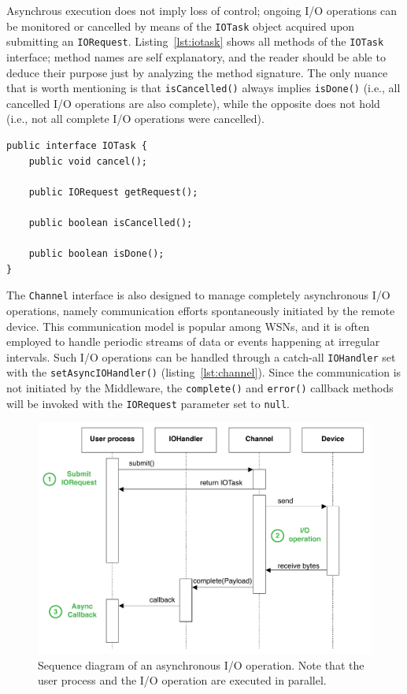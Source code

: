 Asynchrous execution does not imply loss of control; ongoing I/O operations can be monitored or cancelled by means of the \texttt{IOTask} object acquired upon submitting an \texttt{IORequest}. Listing~\ref{lst:iotask} shows all methods of the \texttt{IOTask} interface; method names are self explanatory, and the reader should be able to deduce their purpose just by analyzing the method signature. The only nuance that is worth mentioning is that \texttt{isCancelled()} always implies \texttt{isDone()} (i.e., all cancelled I/O operations are also complete), while the opposite does not hold (i.e., not all complete I/O operations were cancelled).

\lstset{language=Java}
\begin{lstlisting}[float,floatplacement=!hbt,caption=The IOTask interface,label={lst:iotask}]
public interface IOTask {
	public void cancel();
	
	public IORequest getRequest();
	
	public boolean isCancelled();
	
	public boolean isDone();
}
\end{lstlisting}

The \texttt{Channel} interface is also designed to manage completely asynchronous I/O operations, namely communication efforts spontaneously initiated by the remote device. This communication model is popular among WSNs, and it is often employed to handle periodic streams of data or events happening at irregular intervals. Such I/O operations can be handled through a catch-all \texttt{IOHandler} set with the \texttt{setAsyncIOHandler()} (listing~\ref{lst:channel}). Since the communication is not initiated by the Middleware, the \texttt{complete()} and \texttt{error()} callback methods will be invoked with the \texttt{IORequest} parameter set to \texttt{null}.

\begin{figure}[!hbt]
\includegraphics[width=\textwidth]{imgs/async_channel_sequence.pdf}
\caption{Sequence diagram of an asynchronous I/O operation. Note that the user process and the I/O operation are executed in parallel.}
\label{fig:channel.async}
\end{figure}



